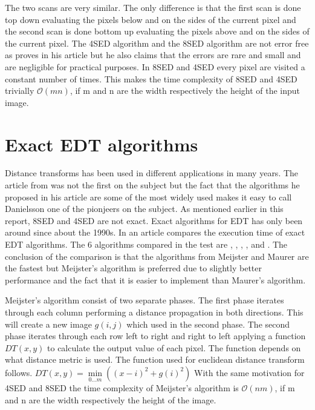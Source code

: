 The two scans are very similar. The only difference is that the first scan is done top down evaluating the pixels below and on the sides of the current pixel and the second scan is done bottom up evaluating the pixels above and on the sides of the current pixel\citep{Ragnemalm:1993}. The 4SED algorithm and the 8SED algorithm are not error free as \citet{Danielsson} proves in his article but he also claims that the errors are rare and small and are negligible for practical purposes. In 8SED and 4SED every pixel are visited a constant number of times. This makes the time complexity of 8SED and 4SED trivially $\mathcal{O}(mn)$, if m and n are the width respectively the height of the input image.
\section{Exact EDT algorithms}\label{exactEDT}
Distance transforms has been used in different applications in many years. The article from \citet{Danielsson} was not the first on the subject but the fact that the algorithms he proposed in his article are some of the most widely used\citep{edtcompare} makes it easy to call Danielsson one of the pionjeers on the subject. As mentioned earlier in this report, 8SED and 4SED are not exact. Exact algorithms for EDT has only been around since about the 1990s. In an article \citet{edtcompare} compares the execution time of exact EDT algorithms. The 6 algorithms compared in the test are \citet{meijster}, \citet{maurer}, \citet{eggers}, \citet{lotufo}, \citet{cuisenaire} and \citet{saito}. The conclusion of the comparison is that the algorithms from Meijster and Maurer are the fastest but Meijster's algorithm is preferred due to slightly better performance and the fact that it is easier to implement than Maurer's algorithm.

Meijster's algorithm consist of two separate phases. The first phase iterates through each column performing a distance propagation in both directions. This will create a new image \begin{math}g(i, j)\end{math} which used in the second phase. The second phase iterates through each row left to right and right to left applying a function \begin{math}DT(x, y)\end{math} to calculate the output value of each pixel. The function depends on what distance metric is used. The function used for euclidean distance transform follows.\vspace{\baselineskip}\newline
\begin{math}
	DT(x, y) = \min\limits_{0\dots m}((x-i)^2+g(i)^2)
\end{math}\vspace{\baselineskip}\newline
With the same motivation for 4SED and 8SED the time complexity of Meijster's algorithm is $\mathcal{O}(nm)$, if m and n are the width respectively the height of the image.

